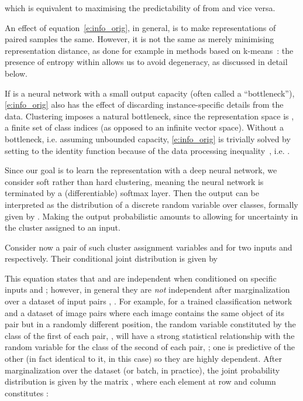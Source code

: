 \documentclass[10pt,twocolumn,letterpaper]{article}
\begin{document}
which is equivalent to maximising the predictability of  from  and vice versa. 

An effect of equation~\cref{e:info_orig}, in general, is to make representations of paired samples the same.
However, it is not the same as merely minimising representation distance, as done for example in methods based on k-means~\cite{caron2018deep,haeusser2018associative}: the presence of entropy within  allows us to avoid degeneracy, as discussed in detail below.





If  is a neural network with a small output capacity (often called a ``bottleneck''), \cref{e:info_orig} also has the effect of discarding instance-specific details from the data.
Clustering imposes a natural bottleneck, since the representation space is , a finite set of class indices (as opposed to an infinite vector space). 
Without a bottleneck, i.e. assuming unbounded capacity, \cref{e:info_orig} is trivially solved by setting  to the identity function because of the data processing inequality~\cite{cover2012elements}, i.e. .

\newcommand{\bPhi}{\Phi}

Since our goal is to learn the representation with a deep neural network, we consider soft rather than hard clustering, meaning the neural network  is terminated by a (differentiable) softmax layer.
Then the output  can be interpreted as the distribution of a discrete random variable  over  classes, formally given by . Making the output probabilistic amounts to allowing for uncertainty in the cluster assigned to an input.

Consider now a pair of such cluster assignment variables  and  for two inputs  and  respectively.
Their conditional joint distribution is given by

This equation states that  and  are independent
when conditioned on specific inputs  and ; however, in general they are \emph{not} independent after marginalization over a dataset of input pairs , .
For example, for a trained classification network  and a dataset of image pairs where each image contains the same object of its pair but in a randomly different position, the random variable constituted by the class of the first of each pair, , will have a strong statistical relationship with the random variable for the class of the second of each pair, ; one is predictive of the other (in fact identical to it, in this case) so they are highly dependent. 
After marginalization over the dataset (or batch, in practice), the joint probability distribution is given by the  matrix , where each element at row  and column  constitutes :
\end{document}
